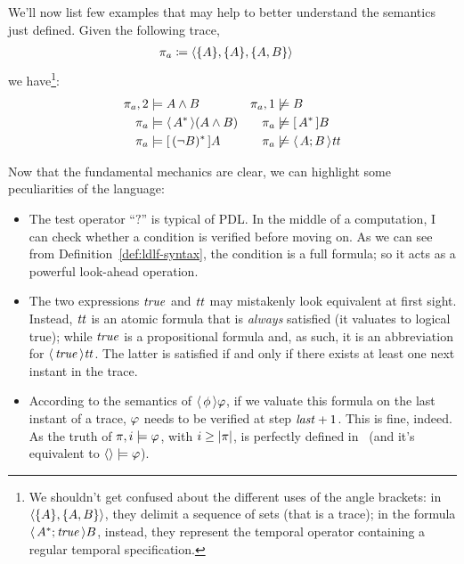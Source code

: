 \begin{example}
	We'll now list few examples that may help to better understand the semantics
	just defined. Given the following trace,
	\begin{align*}
		\pi_a &\coloneqq \langle \{A\}, \{A\}, \{A, B\} \rangle
	\end{align*}
	we have\footnote{We shouldn't get confused about the different uses of the
	angle brackets: in $\langle \{A\}, \{A, B\} \rangle$, they delimit a
	sequence of sets (that is a trace); in the formula $\langle\, {A^*; \text{\textit{true}}} \,\rangle B$,
	instead, they represent the temporal operator containing a regular temporal
	specification.}:
	\begin{align*}
		\pi_a, 2 &\models A \land B &
		\pi_a, 1 &\not\models B\\
		\pi_a &\models \langle\, {A^*} \,\rangle(A \land B) &
		\pi_a &\not\models [\, {A^*} \,]B \\
		\pi_a &\models [\, {(\neg B)^*} \,]A &
		\pi_a &\not\models \langle\, {A; B} \,\rangle\text{\textit{tt}}
	\end{align*}
\end{example}

Now that the fundamental mechanics are clear, we can highlight some
peculiarities of the language:
\begin{itemize}
	\item The test operator ``$?$'' is typical of PDL. In the middle of a
		\re{} computation, I can check whether a condition is verified before
		moving on. As we can see from Definition~\ref{def:ldlf-syntax}, the
		condition is a full \ldl{} formula; so it acts as a powerful look-ahead
		operation.
	\item The two expressions $\text{\textit{true}}$ and $\text{\textit{tt}}$ may mistakenly look equivalent
		at first sight. Instead, $\text{\textit{tt}}$ is an atomic formula that is \emph{always}
		satisfied (it valuates to logical true); while $\text{\textit{true}}$ is a propositional
		formula and, as such, it is an abbreviation for $\langle\, {\text{\textit{true}}} \,\rangle\text{\textit{tt}}$.
		The latter is satisfied if and only if there exists at least one next
		instant in the trace.
	\item According to the semantics of $\langle\, {\phi} \,\rangle\varphi$, if we
		valuate this formula on the last instant of a trace, $\varphi$ needs to
		be verified at step $\text{\textit{last}}+1$. This is fine, indeed. As the truth
		of $\pi, i \models \varphi$, with $i \ge \lvert\pi\rvert$, is perfectly
		defined in~\ldl{} (and it's equivalent to $\langle \rangle \models
		\varphi$).
\end{itemize}

